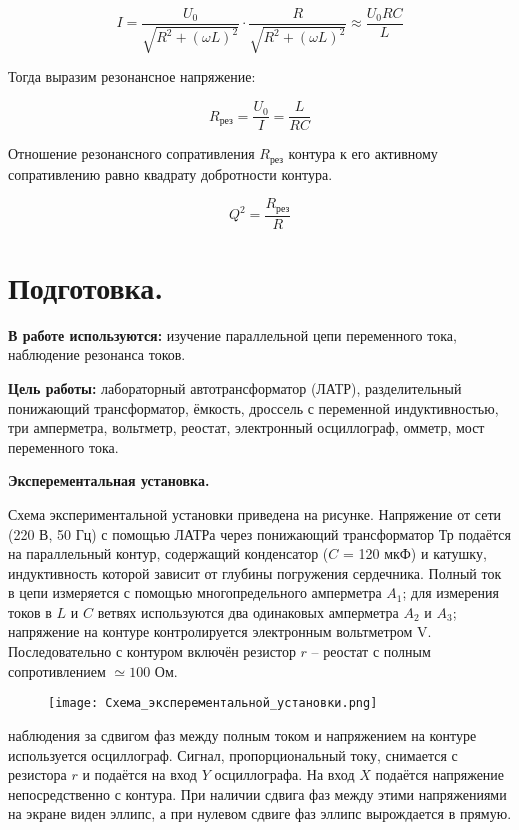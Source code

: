     \begin{equation*}
        I = \frac{U_0}{\sqrt{R^2 + (\omega L)^2}} \cdot \frac{R}{\sqrt{R^2 + (\omega L)^2}} \approx \frac{U_0 R C}{L}
    \end{equation*}

    Тогда выразим резонансное напряжение:

    \begin{equation*}
        R_{\text{рез}} = \frac{U_0}{I} = \frac{L}{R C}
    \end{equation*}

    \noindent Отношение резонансного сопративления $R_{\text{рез}}$ контура
    к его активному сопративлению равно квадрату добротности контура.

    \begin{equation*}
        Q^2 = \frac{R_{\text{рез}}}{R}
    \end{equation*}

    \section*{Подготовка.}

    \noindent \textbf{В работе используются:} изучение параллельной цепи переменного тока, наблюдение резонанса токов.
	
	\noindent \textbf{Цель работы:} лабораторный автотрансформатор (ЛАТР),
    разделительный понижающий трансформатор, ёмкость, дроссель с переменной индуктивностью, три амперметра, вольтметр, реостат, электронный осциллограф, омметр, мост переменного тока.
	
    \hfill

    \noindent \textbf{Эксперементальная установка.}

    \noindent Схема экспериментальной установки
    приведена на рисунке. Напряжение от сети (220 В, 50 Гц) с помощью ЛАТРа через понижающий трансформатор Тр подаётся на параллельный
    контур, содержащий конденсатор ($C$ = 120 мкФ) и катушку, индуктивность которой зависит от глубины погружения сердечника. Полный ток
    в цепи измеряется с помощью многопредельного амперметра $A_1$; для измерения токов в $L$ и $C$ ветвях используются два одинаковых амперметра
    $A_2$ и $A_3$; напряжение на контуре контролируется электронным вольтметром V. Последовательно с контуром включён резистор $r$ -- реостат с полным сопротивлением $\simeq 100$ Ом.

    \begin{figure}[h!]
        \centering
        \texttt{[image: Схема\_эксперементальной\_установки.png]}
        \caption{}
    \end{figure}

    \hfill

     наблюдения за сдвигом фаз между полным током и напряжением
    на контуре используется осциллограф. Сигнал, пропорциональный току,
    снимается с резистора $r$ и подаётся на вход $Y$ осциллографа. На вход $X$
    подаётся напряжение непосредственно с контура. При наличии сдвига
    фаз между этими напряжениями на экране виден эллипс, а при нулевом
    сдвиге фаз эллипс вырождается в прямую.

